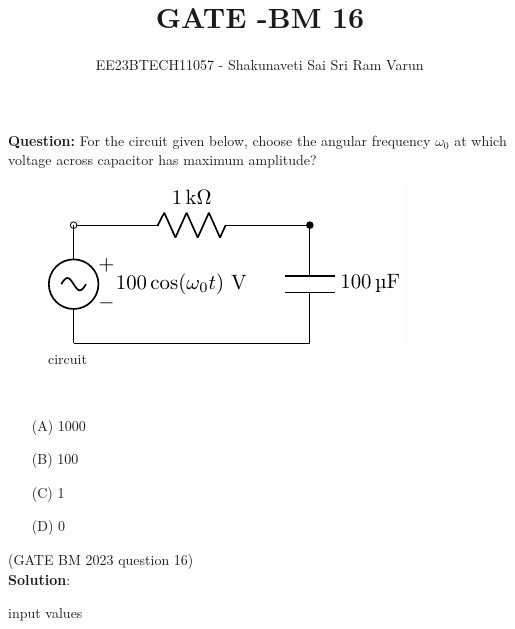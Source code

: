 \documentclass[journal,12pt,twocolumn]{IEEEtran}
\theoremstyle{remark}
\begin{document}

\vspace{3cm}

\title{GATE -BM 16}
\author{EE23BTECH11057 - Shakunaveti Sai Sri Ram Varun$^{}$%
}
\maketitle
\newpage
\bigskip
\vspace{2cm}
\textbf{Question: }
For the circuit given below, choose the angular frequency $ \omega_0$ at which voltage across capacitor has maximum amplitude?
\begin{figure}[h!]
    \includegraphics[width = \columnwidth]{figs/c_fig1.pdf}
    \caption{circuit }
    \centering
    \label{fig: bm_16_fig_1}
\end{figure}\\
\begin{enumerate}
    \item[(A)] 1000\\
    \item[(B)] 100\\
    \item[(C)] 1\\
    \item[(D)] 0   
\end{enumerate}
\hfill(GATE BM 2023 question 16)\\
\textbf{Solution}:\\
\begin{table}[h!] 
\centering

\caption{input values}
\label{tab: table-bm16}
\end{table}
\end{document}
